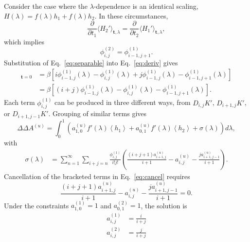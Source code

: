 \documentclass{article}
\let\vec\mathbf
\begin{document}
Consider the case where the $\lambda$-dependence is an identical scaling, $H(\lambda) = f(\lambda)h_1 + f(\lambda)h_2$. In these circumstances,
\begin{equation*}
\frac{\partial}{\partial t_1}
	\langle H_2' \rangle_{\vec t, \lambda} = 
\frac{\partial}{\partial t_2}
	\langle H_1' \rangle_{\vec t, \lambda},
\end{equation*}
which implies
\begin{equation}
\phi_{i,j}^{(2)} = \phi_{i-1,j+1}^{(1)}.
\label{eq:separable}
\end{equation}
Substitution of Eq.~\ref{eq:separable} into Eq.~\ref{eq:deriv} gives
\begin{align}
[D_{i,j}K_\lambda']_{\vec t=0} &=
	\beta\left[
		i \phi_{i-1, j}^{(1)}(\lambda) -
    	\phi_{i,j}^{(1)}(\lambda) +
    	j \phi_{i-1, j}^{(1)}(\lambda) -
    	\phi_{i-1,j+1}^{(1)}(\lambda)
    \right] \nonumber \\
    &=
	\beta\left[
		(i + j)\phi_{i-1, j}^{(1)}(\lambda) -
    	\phi_{i,j}^{(1)}(\lambda) -
    	\phi_{i-1,j+1}^{(1)}(\lambda)
    \right].
\end{align}
Each term $\phi_{i,j}^{(1)}$ can be produced in three different ways, from $D_{i,j}K'$, $D_{i+1,j}K'$, or $D_{i+1,j-1}K'$. Grouping of similar terms gives
\begin{equation}
\Delta\Delta A^{(u)} =
	\int_0^1 \left(
        a_{1,0}^{(u)}f'(\lambda)
        \left\langle h_1 \right\rangle +
        a_{0,1}^{(u)}f'(\lambda)
        \left\langle h_2 \right\rangle +
        \sigma(\lambda)
    \right) d\lambda,
\end{equation}
with
\begin{align}
\sigma(\lambda) &=
	\sum_{n=1}^{\infty}
    \sum_{i+j=n}
        \frac
        	{\phi_{i,j}^{(1)}}
            {i!j!}
        \left(
            \frac
                {(i+j+1)a_{i+1,j}^{(u)}}
                {i+1} -
            a_{i,j}^{(u)} -
           	\frac
            	{j a_{i+1,j-1}^{(u)}}
                {i+1}
		\right).
\label{eq:cancel}
\end{align}
Cancellation of the bracketed terms in Eq.~\ref{eq:cancel} requires
\begin{equation}
\frac
	{(i+j+1)a_{i+1,j}^{(u)}}
	{i+1} -
a_{i,j}^{(u)} -
\frac
	{j a_{i+1,j-1}^{(u)}}
	{i+1}
= 0.
\end{equation}
Under the constraints $a_{1,0}^{(1)} = 1$ and $a_{0,1}^{(2)} = 1$, the solution is
\begin{align}
a_{i,j}^{(1)} &= \frac{i}{i+j} \nonumber\\
a_{i,j}^{(2)} &= \frac{j}{i+j} \nonumber\\
\label{eq:splitting}
\end{align}
\end{document}
